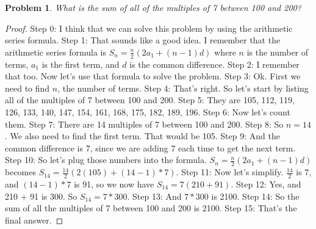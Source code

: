 \documentclass{article}
\newtheorem{theorem}{Problem}
\begin{document}
\begin{theorem}
What is the sum of all of the multiples of 7 between 100 and 200?
\end{theorem}

\begin{proof}
Step 0: I think that we can solve this problem by using the arithmetic series formula.
Step 1: That sounds like a good idea. I remember that the arithmetic series formula is $S_n = \frac{n}{2}(2a_1 + (n-1)d)$ where $n$ is the number of terms, $a_1$ is the first term, and $d$ is the common difference.
Step 2: I remember that too. Now let's use that formula to solve the problem.
Step 3: Ok. First we need to find $n$, the number of terms.
Step 4: That's right. So let's start by listing all of the multiples of 7 between 100 and 200.
Step 5: They are 105, 112, 119, 126, 133, 140, 147, 154, 161, 168, 175, 182, 189, 196.
Step 6: Now let's count them.
Step 7: There are 14 multiples of 7 between 100 and 200.
Step 8: So $n = 14$. We also need to find the first term. That would be 105.
Step 9: And the common difference is 7, since we are adding 7 each time to get the next term.
Step 10: So let's plug those numbers into the formula. $S_n = \frac{n}{2}(2a_1 + (n-1)d)$ becomes $S_{14} = \frac{14}{2}(2(105) + (14-1)*7)$.
Step 11: Now let's simplify. $\frac{14}{2}$ is 7, and $(14-1)*7$ is 91, so we now have $S_{14} = 7(210 + 91)$.
Step 12: Yes, and 210 + 91 is 300. So $S_{14} = 7 * 300$.
Step 13: And $7 * 300$ is 2100.
Step 14: So the sum of all the multiples of 7 between 100 and 200 is 2100.
Step 15: That's the final answer.
\end{proof}
\end{document}
